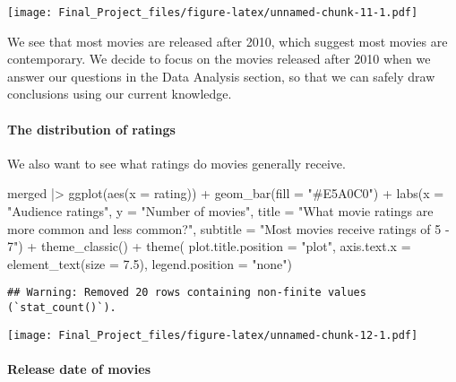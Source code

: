 \documentclass[
]{article}
\newenvironment{Shaded}{\begin{snugshade}}{\end{snugshade}}
\newcommand{\AttributeTok}[1]{\textcolor[rgb]{0.77,0.63,0.00}{#1}}
\newcommand{\FloatTok}[1]{\textcolor[rgb]{0.00,0.00,0.81}{#1}}
\newcommand{\FunctionTok}[1]{\textcolor[rgb]{0.00,0.00,0.00}{#1}}
\newcommand{\NormalTok}[1]{#1}
\newcommand{\SpecialCharTok}[1]{\textcolor[rgb]{0.00,0.00,0.00}{#1}}
\newcommand{\StringTok}[1]{\textcolor[rgb]{0.31,0.60,0.02}{#1}}
\begin{document}
\texttt{[image: Final\_Project\_files/figure-latex/unnamed-chunk-11-1.pdf]}

We see that most movies are released after 2010, which suggest most
movies are contemporary. We decide to focus on the movies released after
2010 when we answer our questions in the Data Analysis section, so that
we can safely draw conclusions using our current knowledge.

\hypertarget{the-distribution-of-ratings}{%
\paragraph{The distribution of
ratings}\label{the-distribution-of-ratings}}

We also want to see what ratings do movies generally receive.

\begin{Shaded}
\begin{Highlighting}[]
\NormalTok{merged }\SpecialCharTok{|\textgreater{}}
  \FunctionTok{ggplot}\NormalTok{(}\FunctionTok{aes}\NormalTok{(}\AttributeTok{x =}\NormalTok{ rating)) }\SpecialCharTok{+}
  \FunctionTok{geom\_bar}\NormalTok{(}\AttributeTok{fill =} \StringTok{"\#E5A0C0"}\NormalTok{) }\SpecialCharTok{+}
  \FunctionTok{labs}\NormalTok{(}\AttributeTok{x =} \StringTok{"Audience ratings"}\NormalTok{,}
       \AttributeTok{y =} \StringTok{"Number of movies"}\NormalTok{,}
       \AttributeTok{title =} \StringTok{"What movie ratings are more common and less common?"}\NormalTok{,}
       \AttributeTok{subtitle =} \StringTok{"Most movies receive ratings of 5 {-} 7"}\NormalTok{) }\SpecialCharTok{+}
  \FunctionTok{theme\_classic}\NormalTok{() }\SpecialCharTok{+}
  \FunctionTok{theme}\NormalTok{(}
        \AttributeTok{plot.title.position =} \StringTok{"plot"}\NormalTok{,}
        \AttributeTok{axis.text.x =} \FunctionTok{element\_text}\NormalTok{(}\AttributeTok{size =} \FloatTok{7.5}\NormalTok{),}
        \AttributeTok{legend.position =} \StringTok{"none"}\NormalTok{)}
\end{Highlighting}
\end{Shaded}

\begin{verbatim}
## Warning: Removed 20 rows containing non-finite values (`stat_count()`).
\end{verbatim}

\texttt{[image: Final\_Project\_files/figure-latex/unnamed-chunk-12-1.pdf]}

\hypertarget{release-date-of-movies}{%
\paragraph{Release date of movies}\label{release-date-of-movies}}
\end{document}
